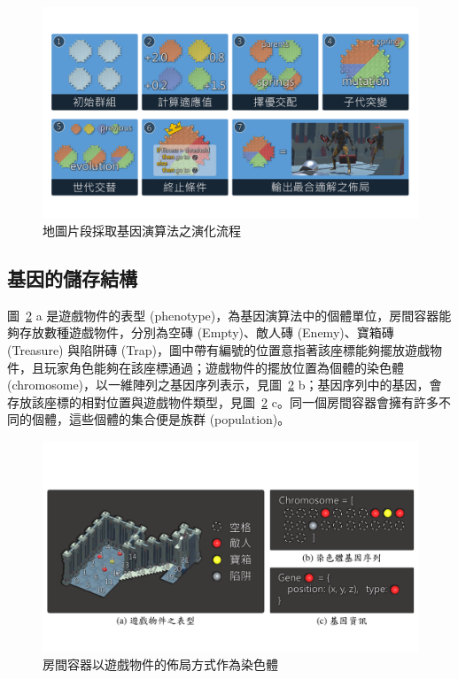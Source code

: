\begin{figure}[ht]
  \begin{center}
    \includegraphics[width=1.0\textwidth]{figures/segments-with-ga.pdf}
    \caption{地圖片段採取基因演算法之演化流程} 
    \label{fig:segments-with-ga}
  \end{center}
\end{figure}

\subsection{基因的儲存結構}
\label{ssec:method-segments-gene}

圖~\ref{fig:segments-gene-expression} a 是遊戲物件的表型 (phenotype)，為基因演算法中的個體單位，房間容器能夠存放數種遊戲物件，分別為空磚 (Empty)、敵人磚 (Enemy)、寶箱磚 (Treasure) 與陷阱磚 (Trap)，圖中帶有編號的位置意指著該座標能夠擺放遊戲物件，且玩家角色能夠在該座標通過；遊戲物件的擺放位置為個體的染色體 (chromosome)，以一維陣列之基因序列表示，見圖~\ref{fig:segments-gene-expression} b；基因序列中的基因，會存放該座標的相對位置與遊戲物件類型，見圖~\ref{fig:segments-gene-expression} c。同一個房間容器會擁有許多不同的個體，這些個體的集合便是族群 (population)。

\begin{figure}[ht]
  \begin{center}
    \includegraphics[width=1.0\textwidth]{figures/segments-gene-expression.pdf}
    \caption{房間容器以遊戲物件的佈局方式作為染色體}
    \label{fig:segments-gene-expression}
  \end{center}
\end{figure}

